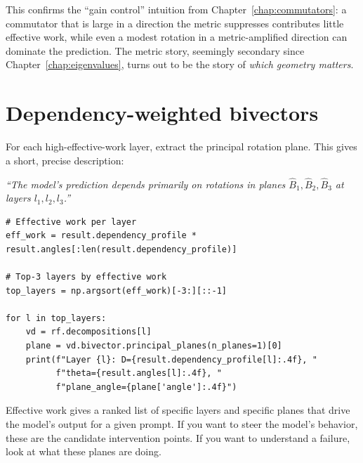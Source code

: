\documentclass[11pt, twoside, openright]{memoir}
\numberwithin{equation}{chapter}
\begin{document}
This confirms the ``gain control'' intuition from
Chapter~\ref{chap:commutators}: a commutator that is large in a
direction the metric suppresses contributes little effective work,
while even a modest rotation in a metric-amplified direction can
dominate the prediction.  The metric story, seemingly secondary since
Chapter~\ref{chap:eigenvalues}, turns out to be the story of
\emph{which geometry matters}.

\section{Dependency-weighted bivectors}

For each high-effective-work layer, extract the principal rotation plane.
This gives a short, precise description:

\emph{``The model's prediction depends primarily on rotations in planes
$\hat{B}_1, \hat{B}_2, \hat{B}_3$ at layers $l_1, l_2, l_3$.''}

\begin{lstlisting}[caption={Identifying the functionally relevant planes}]
# Effective work per layer
eff_work = result.dependency_profile * result.angles[:len(result.dependency_profile)]

# Top-3 layers by effective work
top_layers = np.argsort(eff_work)[-3:][::-1]

for l in top_layers:
    vd = rf.decompositions[l]
    plane = vd.bivector.principal_planes(n_planes=1)[0]
    print(f"Layer {l}: D={result.dependency_profile[l]:.4f}, "
          f"theta={result.angles[l]:.4f}, "
          f"plane_angle={plane['angle']:.4f}")
\end{lstlisting}

\begin{transformer}
Effective work gives a ranked list of specific layers and specific
planes that drive the model's output for a given prompt.  If you want
to steer the model's behavior, these are the candidate intervention
points.  If you want to
understand a failure, look at what these planes are doing.
\end{transformer}
\end{document}

